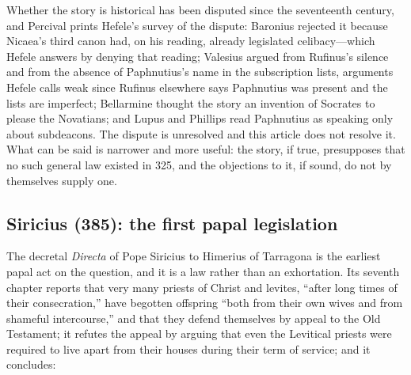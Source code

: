 Whether the story is historical has been disputed since the seventeenth century, and Percival prints Hefele's survey of the dispute: Baronius rejected it because Nicaea's third canon had, on his reading, already legislated celibacy---which Hefele answers by denying that reading; Valesius argued from Rufinus's silence and from the absence of Paphnutius's name in the subscription lists, arguments Hefele calls weak since Rufinus elsewhere says Paphnutius was present and the lists are imperfect; Bellarmine thought the story an invention of Socrates to please the Novatians; and Lupus and Phillips read Paphnutius as speaking only about subdeacons. The dispute is unresolved and this article does not resolve it. What can be said is narrower and more useful: the story, if true, presupposes that no such general law existed in 325, and the objections to it, if sound, do not by themselves supply one.

\subsection{Siricius (385): the first papal legislation}

The decretal \emph{Directa} of Pope Siricius to Himerius of Tarragona is the earliest papal act on the question, and it is a law rather than an exhortation. Its seventh chapter reports that very many priests of Christ and levites, ``after long times of their consecration,'' have begotten offspring ``both from their own wives and from shameful intercourse,'' and that they defend themselves by appeal to the Old Testament; it refutes the appeal by arguing that even the Levitical priests were required to live apart from their houses during their term of service; and it concludes:

